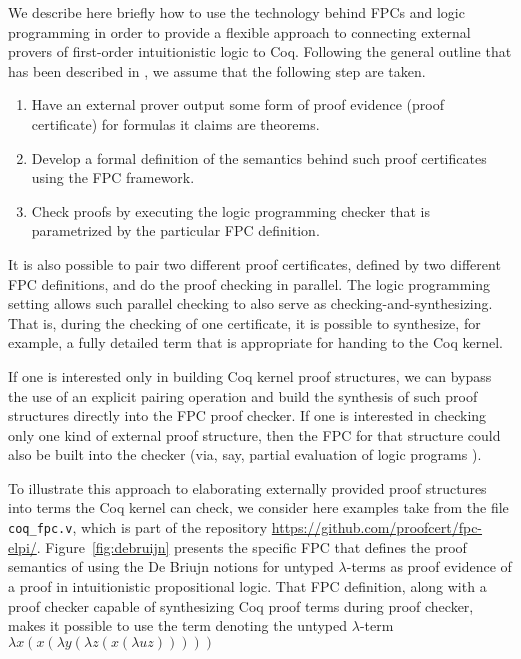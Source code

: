 We describe here briefly how to use the technology behind FPCs and
logic programming in order to provide a flexible approach to
connecting external provers of first-order intuitionistic logic to
Coq.
%
Following the general outline that has been described in
\cite{blanco17cade}, we assume that the following step are taken.
%
\begin{enumerate}
\item Have an external prover output some form of proof evidence
  (proof certificate) for formulas it claims are theorems.

\item Develop a formal definition of the semantics behind such proof
  certificates using the FPC framework.

\item Check proofs by executing the logic programming checker that is
  parametrized by the particular FPC definition.
\end{enumerate}
%
It is also possible to pair two different proof certificates, defined
by two different FPC definitions, and do the proof checking in
parallel.  The logic programming setting allows such parallel checking
to also serve as checking-and-synthesizing.  That is, during the
checking of one certificate, it is possible to synthesize, for
example, a fully detailed term that is appropriate for handing to the
Coq kernel.

If one is interested only in building Coq kernel proof structures, we
can bypass the use of an explicit pairing operation and build the
synthesis of such proof structures directly into the FPC proof
checker.  If one is interested in checking only one kind of external
proof structure, then the FPC for that structure could also be built
into the checker (via, say, partial evaluation of logic programs
\cite{lloyd91jlp}).

To illustrate this approach to elaborating externally provided proof
structures into terms the Coq kernel can check, we consider here
examples take from the file \verb+coq_fpc.v+, which is part of the
repository \url{https://github.com/proofcert/fpc-elpi/}.
Figure~\ref{fig:debruijn} presents the specific FPC that defines the
proof semantics of using the De Briujn notions for untyped
$\lambda$-terms as proof evidence of a proof in intuitionistic
propositional logic.  That FPC definition, along with a proof checker
capable of synthesizing Coq proof terms during proof checker, makes it
possible to use the term denoting the untyped $\lambda$-term
$\lambda x (x (\lambda y (\lambda z (x (\lambda u z)))))$

